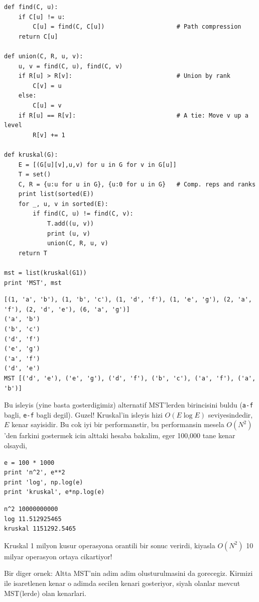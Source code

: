 \documentclass[12pt,fleqn]{article}\usepackage{../common}
\begin{document}
\begin{verbatim}
def find(C, u):
    if C[u] != u:
        C[u] = find(C, C[u])                    # Path compression
    return C[u]

def union(C, R, u, v):
    u, v = find(C, u), find(C, v)
    if R[u] > R[v]:                             # Union by rank
        C[v] = u
    else:
        C[u] = v
    if R[u] == R[v]:                            # A tie: Move v up a level
        R[v] += 1

def kruskal(G):
    E = [(G[u][v],u,v) for u in G for v in G[u]]
    T = set()
    C, R = {u:u for u in G}, {u:0 for u in G}   # Comp. reps and ranks
    print list(sorted(E))
    for _, u, v in sorted(E):
        if find(C, u) != find(C, v):
            T.add((u, v))
            print (u, v)
            union(C, R, u, v)
    return T

mst = list(kruskal(G1))
print 'MST', mst
\end{verbatim}

\begin{verbatim}
[(1, 'a', 'b'), (1, 'b', 'c'), (1, 'd', 'f'), (1, 'e', 'g'), (2, 'a', 'f'), (2, 'd', 'e'), (6, 'a', 'g')]
('a', 'b')
('b', 'c')
('d', 'f')
('e', 'g')
('a', 'f')
('d', 'e')
MST [('d', 'e'), ('e', 'g'), ('d', 'f'), ('b', 'c'), ('a', 'f'), ('a', 'b')]
\end{verbatim}

Bu isleyis (yine basta gosterdigimiz) alternatif MST'lerden birincisini
buldu (\verb!a-f! bagli, \verb!e-f! bagli degil). Guzel! Kruskal'in isleyis
hizi $O(E \log E)$ seviyesindedir, $E$ kenar sayisidir. Bu cok iyi bir
performanstir, bu performansin mesela $O(N^2)$'den farkini gostermek icin
alttaki hesaba bakalim, eger 100,000 tane kenar olsaydi,

\begin{verbatim}
e = 100 * 1000
print 'n^2', e**2
print 'log', np.log(e)
print 'kruskal', e*np.log(e)
\end{verbatim}

\begin{verbatim}
n^2 10000000000
log 11.512925465
kruskal 1151292.5465
\end{verbatim}

Kruskal 1 milyon kusur operasyona orantili bir sonuc verirdi, kiyasla
$O(N^2)$ 10 milyar operasyon ortaya cikartiyor! 

Bir diger ornek: Altta MST'nin adim adim olusturulmasini da
gorecegiz. Kirmizi ile isaretlenen kenar o adimda secilen kenari
gosteriyor, siyah olanlar mevcut MST(lerde) olan kenarlari.
\end{document}
